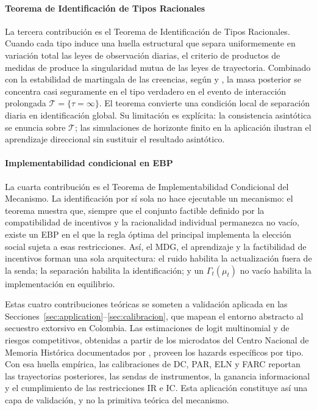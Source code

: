 \documentclass[review,authoryear,12pt]{elsarticle}
\theoremstyle{plain}
\theoremstyle{definition}
\newcommand{\1}{\mathbf{1}}
\begin{document}
\paragraph{Teorema de Identificación de Tipos Racionales}
La tercera contribución es el Teorema de Identificación de Tipos Racionales. Cuando cada tipo induce una huella estructural que separa uniformemente en variación total las leyes de observación diarias, el criterio de productos de medidas de \citet{Kakutani1948} produce la singularidad mutua de las leyes de trayectoria. Combinado con la estabilidad de martingala de las creencias, según \citet{Doob1953Stochastic} y \citet{BlackwellDubins1962}, la masa posterior se concentra casi seguramente en el tipo verdadero en el evento de interacción prolongada $\mathcal{T}=\{\tau=\infty\}$. El teorema convierte una condición local de separación diaria en identificación global. Su limitación es explícita: la consistencia asintótica se enuncia sobre $\mathcal{T}$; las simulaciones de horizonte finito en la aplicación ilustran el aprendizaje direccional sin sustituir el resultado asintótico.

\paragraph{Implementabilidad condicional en EBP}
La cuarta contribución es el Teorema de Implementabilidad Condicional del Mecanismo. La identificación por sí sola no hace ejecutable un mecanismo: el teorema muestra que, siempre que el conjunto factible definido por la compatibilidad de incentivos y la racionalidad individual permanezca no vacío, existe un EBP en el que la regla óptima del principal implementa la elección social sujeta a esas restricciones. Así, el MDG, el aprendizaje y la factibilidad de incentivos forman una sola arquitectura: el ruido habilita la actualización fuera de la senda; la separación habilita la identificación; y un $\Gamma_t(\mu_t)$ no vacío habilita la implementación en equilibrio.

Estas cuatro contribuciones teóricas se someten a validación aplicada en las Secciones~\ref{sec:application}--\ref{sec:calibracion}, que mapean el entorno abstracto al secuestro extorsivo en Colombia. Las estimaciones de logit multinomial y de riesgos competitivos, obtenidas a partir de los microdatos del Centro Nacional de Memoria Histórica documentados por \citet{cnmh_datos}, proveen los hazards específicos por tipo. Con esa huella empírica, las calibraciones de DC, PAR, ELN y FARC reportan las trayectorias posteriores, las sendas de instrumentos, la ganancia informacional y el cumplimiento de las restricciones IR e IC. Esta aplicación constituye así una capa de validación, y no la primitiva teórica del mecanismo.
\end{document}
